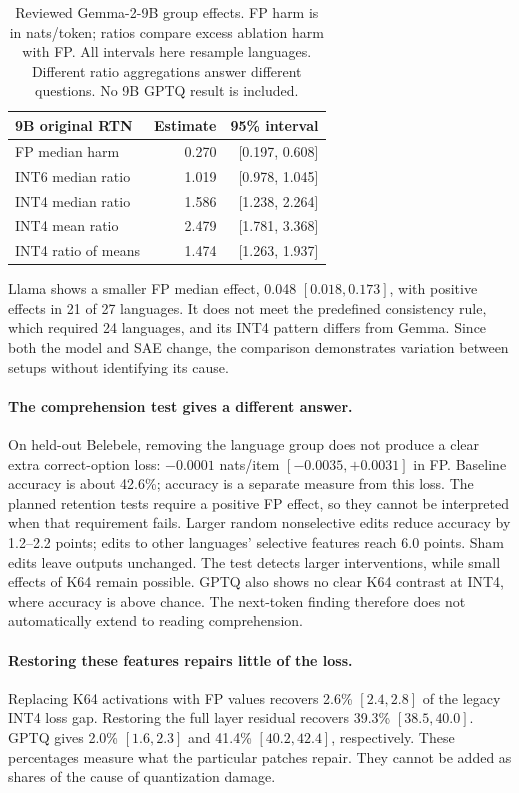 \documentclass[11pt]{article}
\begin{document}
\begin{table}[t]
\centering\small
\begin{tabular}{lrr}
\toprule
9B original RTN & Estimate & 95\% interval\\
\midrule
FP median harm & 0.270 & [0.197, 0.608]\\
INT6 median ratio & 1.019 & [0.978, 1.045]\\
INT4 median ratio & 1.586 & [1.238, 2.264]\\
INT4 mean ratio & 2.479 & [1.781, 3.368]\\
INT4 ratio of means & 1.474 & [1.263, 1.937]\\
\bottomrule
\end{tabular}
\caption{Reviewed Gemma-2-9B group effects. FP harm is in nats/token; ratios compare excess ablation harm with FP. All intervals here resample languages. Different ratio aggregations answer different questions. No 9B GPTQ result is included.}
\label{tab:9b}
\end{table}

Llama shows a smaller FP median effect, 0.048 $[0.018,0.173]$, with positive effects in 21 of 27 languages. It does not meet the predefined consistency rule, which required 24 languages, and its INT4 pattern differs from Gemma. Since both the model and SAE change, the comparison demonstrates variation between setups without identifying its cause.

\paragraph{The comprehension test gives a different answer.}
On held-out Belebele, removing the language group does not produce a clear extra correct-option loss: $-0.0001$ nats/item $[-0.0035,+0.0031]$ in FP. Baseline accuracy is about 42.6\%; accuracy is a separate measure from this loss. The planned retention tests require a positive FP effect, so they cannot be interpreted when that requirement fails. Larger random nonselective edits reduce accuracy by 1.2--2.2 points; edits to other languages' selective features reach 6.0 points. Sham edits leave outputs unchanged. The test detects larger interventions, while small effects of K64 remain possible. GPTQ also shows no clear K64 contrast at INT4, where accuracy is above chance. The next-token finding therefore does not automatically extend to reading comprehension.

\paragraph{Restoring these features repairs little of the loss.}
Replacing K64 activations with FP values recovers 2.6\% $[2.4,2.8]$ of the legacy INT4 loss gap. Restoring the full layer residual recovers 39.3\% $[38.5,40.0]$. GPTQ gives 2.0\% $[1.6,2.3]$ and 41.4\% $[40.2,42.4]$, respectively. These percentages measure what the particular patches repair. They cannot be added as shares of the cause of quantization damage.
\end{document}

